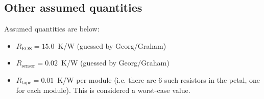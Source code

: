 \subsection{Other assumed quantities}

Assumed quantities are below:
\begin{itemize}
\item $R_\text{EOS}=15.0$~K/W (guessed by Georg/Graham)
\item $R_\text{sensor}=0.02$~K/W (guessed by Georg/Graham)
\item $R_\text{tape}=0.01$~K/W per module (i.e. there are 6 such resistors in the petal, one
for each module). This is considered a worst-case value.
\end{itemize}


